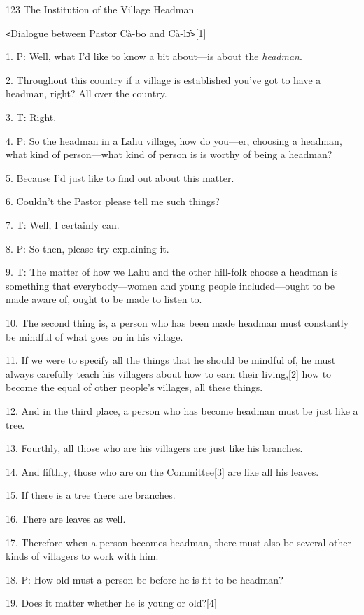 
{123 The Institution of the Village Headman}

{\texttt{<}Dialogue between Pastor Cà-bo and Cà-lɔ̂\texttt{>}[1]}

{1. P: Well, what I'd like to know a bit about---is about the }{\textit{headman}}{.}

{2. Throughout this country if a village is established you've got to have
a headman, right? All over the country.}

{3. T: Right.}

{4. P: So the headman in a Lahu village, how do you---er, choosing a headman,
what kind of person---what kind of person is is worthy of being a headman?}

{5. Because I'd just like to find out about this matter.}

{6. Couldn't the Pastor please tell me such things?}

{7. T: Well, I certainly can.}

{8. P: So then, please try explaining it.}

{9. T: The matter of how we Lahu and the other hill-folk choose a headman
is something that everybody---women and young people included---ought to be made
aware of, ought to be made to listen to.}

{10. The second thing is, a person who has been made headman must constantly
be mindful of what goes on in his village.}

{11. If we were to specify all the things that he should be mindful of,
he must always carefully teach his villagers about how to earn their living,[2]
how to become the equal of other people's villages, all these things.}

{12. And in the third place, a person who has become headman must be just
like a tree.}

{13. Fourthly, all those who are his villagers are just like his branches.}

{14. And fifthly, those who are on the Committee[3] are like all his leaves.}

{15. If there is a tree there are branches.}

{16. There are leaves as well.}

{17. Therefore when a person becomes headman, there must also be several
other kinds of villagers to work with him.}

{18. P: How old must a person be before he is fit to be headman?}

{19. Does it matter whether he is young or old?[4]}

